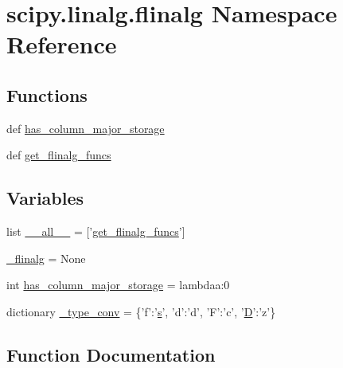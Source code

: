 \hypertarget{namespacescipy_1_1linalg_1_1flinalg}{}\section{scipy.\+linalg.\+flinalg Namespace Reference}
\label{namespacescipy_1_1linalg_1_1flinalg}
\subsection*{Functions}
\begin{DoxyCompactItemize}
\item 
def \hyperlink{namespacescipy_1_1linalg_1_1flinalg_a239a9799f58233aa526d488fdb9485fa}{has\+\_\+column\+\_\+major\+\_\+storage}
\item 
def \hyperlink{namespacescipy_1_1linalg_1_1flinalg_a62dc01c510ebf4da846f189ec3038d46}{get\+\_\+flinalg\+\_\+funcs}
\end{DoxyCompactItemize}
\subsection*{Variables}
\begin{DoxyCompactItemize}
\item 
list \hyperlink{namespacescipy_1_1linalg_1_1flinalg_a22d633c2d05178970cb7ca7a1e92c585}{\+\_\+\+\_\+all\+\_\+\+\_\+} = \mbox{[}'\hyperlink{namespacescipy_1_1linalg_1_1flinalg_a62dc01c510ebf4da846f189ec3038d46}{get\+\_\+flinalg\+\_\+funcs}'\mbox{]}
\item 
\hyperlink{namespacescipy_1_1linalg_1_1flinalg_a3e0a9c2ee3992b2e6c73dec0d79af5f0}{\+\_\+flinalg} = None
\item 
int \hyperlink{namespacescipy_1_1linalg_1_1flinalg_acbde14c8f0d45ef74649edc9dc7249dc}{has\+\_\+column\+\_\+major\+\_\+storage} = lambdaa\+:0
\item 
dictionary \hyperlink{namespacescipy_1_1linalg_1_1flinalg_a998dbabb3a6e06dae7bfe3f510614190}{\+\_\+type\+\_\+conv} = \{'f'\+:'\hyperlink{indexexpr_8h_ae024b0db549122b44c349ae28ec990dc}{s}', 'd'\+:'d', 'F'\+:'c', '\hyperlink{odrpack_8h_a7dae6ea403d00f3687f24a874e67d139}{D}'\+:'z'\}
\end{DoxyCompactItemize}


\subsection{Function Documentation}
\hypertarget{namespacescipy_1_1linalg_1_1flinalg_a62dc01c510ebf4da846f189ec3038d46}{}
